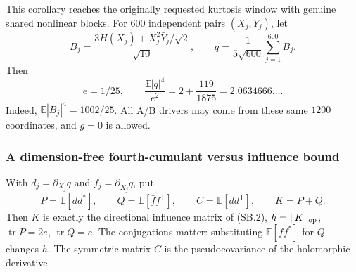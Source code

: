 This corollary reaches the originally requested kurtosis window with
genuine shared nonlinear blocks. For \(600\) independent pairs
\((X_j,Y_j)\), let
\[
 B_j=\frac{3H(X_j)+X_j^2\bar Y_j/\sqrt2}{\sqrt{10}},
 \qquad q=\frac1{5\sqrt{600}}\sum_{j=1}^{600}B_j.
\]
Then
\[
 e=1/25,\qquad
 \frac{\mathbb E|q|^4}{e^2}=2+\frac{119}{1875}
 =2.0634666\ldots .
\]
Indeed, \(\mathbb E|B_j|^4=1002/25\). All A/B drivers may come from
these same \(1200\) coordinates, and \(g=0\) is allowed.

\subsubsection{A dimension-free fourth-cumulant versus influence bound}
\label{sec:sbt-kappa}
With \(d_j=\partial_{X_j}q\) and \(f_j=\partial_{\bar X_j}q\), put
\[
 P=\mathbb E[dd^*],\qquad Q=\mathbb E[\bar f f^{\mathsf T}],\qquad
 C=\mathbb E[dd^{\mathsf T}],\qquad K=P+Q.
 \tag{SB.6a}
\]
Then \(K\) is exactly the directional influence matrix of (SB.2),
\(h=\|K\|_{\rm op}\), \(\operatorname{tr}P=2e\), \(\operatorname{tr}Q=e\).
The conjugations matter: substituting \(\mathbb E[ff^*]\) for \(Q\)
changes \(h\). The symmetric matrix \(C\) is the pseudocovariance of
the holomorphic derivative.

